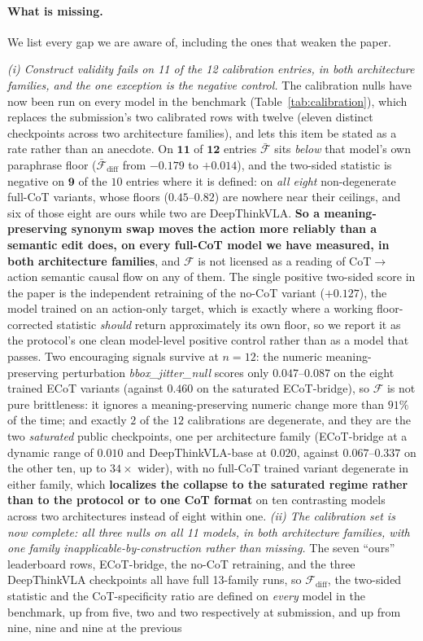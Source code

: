 \documentclass{article}
\begin{document}
\paragraph{What is missing.} We list every gap we are aware of, including the ones that weaken the paper.

\emph{(i) Construct validity fails on 11 of the 12 calibration entries, in both architecture families, and the one exception is the negative control.} The calibration nulls have now been run on every model in the benchmark (Table~\ref{tab:calibration}), which replaces the submission's two calibrated rows with twelve (eleven distinct checkpoints across two architecture families), and lets this item be stated as a rate rather than an anecdote. On $\mathbf{11}$ of $\mathbf{12}$ entries $\bar{\mathcal{F}}$ sits \emph{below} that model's own paraphrase floor ($\bar{\mathcal{F}}_{\text{diff}}$ from $-0.179$ to $+0.014$), and the two-sided statistic is negative on $\mathbf{9}$ of the $10$ entries where it is defined: on \emph{all eight} non-degenerate full-CoT variants, whose floors ($0.45$--$0.82$) are nowhere near their ceilings, and six of those eight are ours while two are DeepThinkVLA. \textbf{So a meaning-preserving synonym swap moves the action more reliably than a semantic edit does, on every full-CoT model we have measured, in both architecture families}, and $\mathcal{F}$ is not licensed as a reading of CoT$\to$action semantic causal flow on any of them. The single positive two-sided score in the paper is the independent retraining of the no-CoT variant ($+0.127$), the model trained on an action-only target, which is exactly where a working floor-corrected statistic \emph{should} return approximately its own floor, so we report it as the protocol's one clean model-level positive control rather than as a model that passes. Two encouraging signals survive at $n{=}12$: the numeric meaning-preserving perturbation \emph{bbox\_jitter\_null} scores only $0.047$--$0.087$ on the eight trained ECoT variants (against $0.460$ on the saturated ECoT-bridge), so $\mathcal{F}$ is not pure brittleness: it ignores a meaning-preserving numeric change more than $91\%$ of the time; and exactly $2$ of the $12$ calibrations are degenerate, and they are the two \emph{saturated} public checkpoints, one per architecture family (ECoT-bridge at a dynamic range of $0.010$ and DeepThinkVLA-base at $0.020$, against $0.067$--$0.337$ on the other ten, up to $34\times$ wider), with no full-CoT trained variant degenerate in either family, which \textbf{localizes the collapse to the saturated regime rather than to the protocol or to one CoT format} on ten contrasting models across two architectures instead of eight within one. \emph{(ii) The calibration set is now complete: all three nulls on all 11 models, in both architecture families, with one family inapplicable-by-construction rather than missing.} The seven ``ours'' leaderboard rows, ECoT-bridge, the no-CoT retraining, and the three DeepThinkVLA checkpoints all have full 13-family runs, so $\mathcal{F}_{\text{diff}}$, the two-sided statistic and the CoT-specificity ratio are defined on \emph{every} model in the benchmark, up from five, two and two respectively at submission, and up from nine, nine and nine at the previous 
\end{document}
